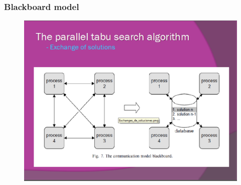 \documentclass{beamer}
\begin{document}
\begin{frame}
\frametitle{Blackboard model }
\begin{figure}[!th]
\begin{center}
\includegraphics[width=1\textwidth]{img/picn14.eps}
\end{center}
\end{figure}
\end{frame}
\end{document}
